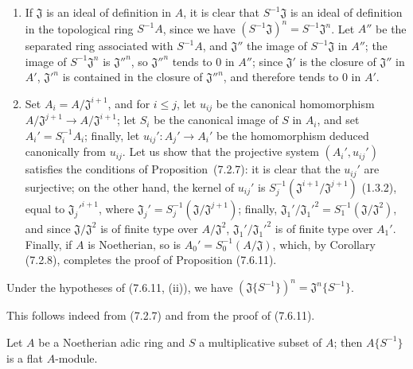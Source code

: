 \begin{enumerate}
  \item[\rm(i)] If $\mathfrak J$ is an ideal of definition in $A$, it is
    clear that $S^{-1}\mathfrak J$ is an ideal of definition in the topological
    ring $S^{-1}A$, since we have
    $(S^{-1}\mathfrak J)^n=S^{-1}\mathfrak J^n$. Let $A''$ be the separated ring
    associated with $S^{-1}A$, and $\mathfrak J''$ the image of $S^{-1}\mathfrak J$ in
    $A''$; the image of $S^{-1}\mathfrak J^n$ is $\mathfrak J''^n$, so
    $\mathfrak J''^n$ tends to 0 in $A''$; since $\mathfrak J'$ is
    the closure of $\mathfrak J''$ in $A'$, $\mathfrak J'^n$ is contained
    in the closure of $\mathfrak J''^n$, and therefore tends to 0 in $A'$.
  \item[\rm(ii)] Set $A_i=A/\mathfrak J^{i+1}$, and for $i\leq j$, let
    $u_{ij}$ be the canonical homomorphism
    $A/\mathfrak J^{j+1}\to A/\mathfrak J^{i+1}$; let $S_i$ be the canonical
    image of $S$ in $A_i$, and set $A_i'=S_i^{-1}A_i$; finally, let
    $u_{ij}':A_j'\to A_i'$ be the homomorphism deduced canonically from $u_{ij}$.
    Let us show that the projective system $(A_i',u_{ij}')$ satisfies the conditions
    of Proposition~(7.2.7): it is clear that the $u_{ij}'$ are surjective;
    on the other hand, the kernel of $u_{ij}'$ is
    $S_j^{-1}(\mathfrak J^{i+1}/\mathfrak J^{j+1})$ (1.3.2), equal to
    $\mathfrak J_j'^{i+1}$, where
    $\mathfrak J_j'=S_j^{-1}(\mathfrak J/\mathfrak J^{j+1})$; finally,
    $\mathfrak J_1'/\mathfrak J_1'^2=S_1^{-1}(\mathfrak J/\mathfrak J^2)$,
    and since $\mathfrak J/\mathfrak J^2$ is of finite type over
    $A/\mathfrak J^2$, $\mathfrak J_1'/\mathfrak J_1'^2$ is of finite type
    over $A_1'$. Finally, if $A$ is Noetherian, so is
    $A_0'=S_0^{-1}(A/\mathfrak J)$, which, by Corollary (7.2.8), completes the proof of Proposition
    (7.6.11).
\end{enumerate}

\begin{corollary}[7.6.12]
\label{0.7.6.12}
Under the hypotheses of (7.6.11, (ii)), we have
$(\mathfrak J\{S^{-1}\})^n=\mathfrak J^n\{S^{-1}\}$.
\end{corollary}

This follows indeed from (7.2.7) and from the proof of (7.6.11).

\begin{proposition}[7.6.13]
\label{0.7.6.13}
Let $A$ be a Noetherian adic ring and $S$ a multiplicative subset of $A$;
then $A\{S^{-1}\}$ is a flat $A$-module.
\end{proposition}

